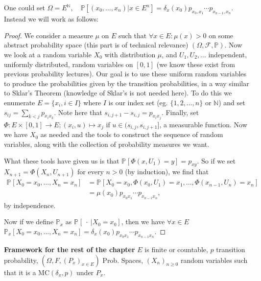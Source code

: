 One could set $\Omega = E^{\mathbb{N}}, \quad \mathbb{P} \left[ (x_0, \ldots ,x_n) | x \in E^n \right] = \delta_x(x_0) p_{x_0,x_1} \cdots p_{x_{n-1},x_n}$.
Instead we will work as follows:
\begin{proof}
	We consider a measure $\mu $ on $E$ such that $\forall x \in E: \mu (x) >0$ on some abstract probability space (this part is of technical relevance) $(\Omega, \mathcal{F}, \mathbb{P} )$. Now we look at a random variable $X_0$ with distribution $\mu$, and $U_1,U_2, \ldots $ independent, uniformly distributed, random variables on $[0,1]$ (we know these exist from previous probability lectures). Our goal is to use these uniform random variables to produce the probabilities given by the transition probabilities, in a way similar to Sklar's Theorem (knowledge of Sklar's is not needed here). To do this we enumerate $E=\{x_i, i \in I \}$ where $I$ is our index set (eg. $\{1,2, \ldots ,n\}$ or  $\mathbb{N}$) and set $s_{ij}= \sum_{k<j}p_{x_ix_k} $. Note here that $s_{i,j+1}-s_{i,j} = p_{x_ix_j} $. Finally, set $\Phi: E \times [0,1] \to E; (x_i,u) \mapsto x_j $ if $u \in (s_{i,j}, s_{i,j+1}]$, a measurable function. Now we have $X_0$ as needed and the tools to construct the sequence of random variables, along with the collection of probability measures we want.

	What these tools have given us is that $\mathbb{P}_{} \left[\Phi(x,U_1) = y  \right] = p_{xy}$. So if we set $X_{n+1} = \Phi(X_n, U_{n+1})$ for every $n>0$ (by induction), we find that
\begin{align}
	\mathbb{P}_{} \left[ X_0=x_0, \ldots ,X_n=x_n \right] &=
		\mathbb{P}_{} \left[ X_0=x_0, \Phi(x_0, U_1)=x_1 , \ldots , \Phi(x_{n-1}, U_{n}) = x_n \right] \\
	&= \mu(x_0)p_{x_0x_1} \cdots p_{x_{n-1}x_n}
,\end{align}
by independence.

Now if we define $\mathbb{P}_{x} $ as $\mathbb{P}_{} \left[\ \cdot\ | X_0 = x_0 \right] $, then we have $\forall x \in E$ $\mathbb{P}_{x} \left[ X_0=x_0, \ldots ,X_n=x_n \right] = \delta_x(x_0)p_{x_0x_1} \cdots p_{x_{n-1}x_n}$.


\end{proof}


\noindent
\textbf{Framework for the rest of the chapter} 
$E$ is finite or countable, $p$ transition probability, $(\Omega, F, (P_x)_{x \in E})$ Prob. Spaces, $(X_n)_{n \geq 0}$ random variables such that it is a  $ \textrm{MC}(\delta_x, p)$ under $P_x$.


